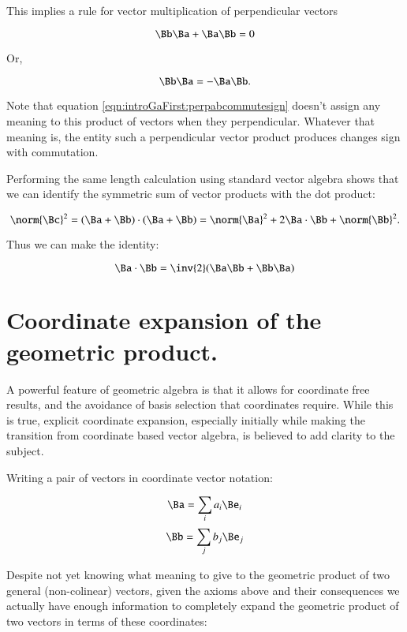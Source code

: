 This implies a rule for vector multiplication of perpendicular vectors

\[
\Bb\Ba + \Ba\Bb = 0
\]

Or, 

\begin{equation}\label{eqn:introGaFirst:perpabcommutesign}
\Bb\Ba = -\Ba\Bb.
\end{equation}

Note that equation \ref{eqn:introGaFirst:perpabcommutesign} doesn't assign any meaning to this product of vectors when they perpendicular.
Whatever that meaning is, the entity such a perpendicular vector product produces changes sign
with commutation.

Performing the same length calculation using standard vector algebra shows that we can identify the symmetric 
sum of vector products with the dot product:

\begin{equation}\label{eqn:introGaFirst:standarddot}
\norm{\Bc}^2 = (\Ba + \Bb) \cdot (\Ba + \Bb) = \norm{\Ba}^2 + 2 \Ba \cdot \Bb + \norm{\Bb}^2.
\end{equation}

Thus we can make the identity:

\begin{equation}\label{eqn:introGaFirst:dotprod}
\Ba \cdot \Bb = \inv{2}(\Ba \Bb + \Bb \Ba)
\end{equation}

\section{Coordinate expansion of the geometric product. }

A powerful feature of geometric algebra is that it allows for coordinate free results, and the avoidance of basis selection
that coordinates require.  While this is true, explicit coordinate expansion, especially
initially while making the transition from coordinate based vector algebra, is believed to add clarity to the subject.

Writing a pair of vectors in coordinate vector notation:

\[
\Ba = \sum_i{a_i \Be_i}
\]
\[
\Bb = \sum_j{b_j \Be_j}
\]

Despite not yet 
knowing what meaning to give to the geometric product of two general (non-colinear) vectors, 
given the axioms above and their consequences we actually have enough information to completely
expand the geometric product of two vectors in terms of these coordinates:


